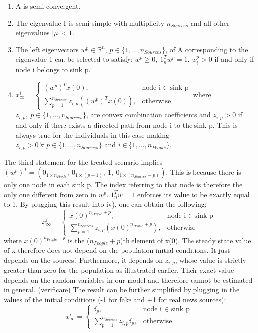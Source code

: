 \begin{enumerate}
	\item
	A is semi-convergent.
	\item
	The eigenvalue 1 is semi-simple with multiplicity $n_{Sources}$ and all other eigenvalues $|\mu|<1$.
	\item
	The left eigenvectors $w^p \in \mathbb{R}^n$, $p\in \{1,...,n_{Sources}\}$, of A corresponding to the eigenvalue 1 can be selected to satisfy: $w^p\geq0,\ 1_n^Tw^p=1$, $w^p_i>0$ if and only if node i belongs to sink p.
	\item
	$
	x_{\infty}^i = 
	\begin{cases}
	(w^p)^Tx(0),& \text{node i $\in$ sink p}\\
	\sum_{p=1}^{n_{Sources}} z_{i,p}((w^p)^Tx(0)), & \text{otherwise}
	\end{cases}
	$
	where $z_{i,p},\ p\in\{1,...,n_{Sources}\}$, are convex combination coefficients and $z_{i,p} > 0$ if and only if there exists a directed path from node i to the sink p. This is always true for the individuals in this case making $z_{i,p} > 0\ \forall\ p \in \{1,...,n_{Sources}\}$ and $i \in \{1,...,n_{People}\}$.
\end{enumerate}
The third statement for the treated scenario implies $(w^p)^T = (0_{1 \times n_{People}},\ 0_{1 \times (p-1)},\ 1,\ 0_{1 \times (n_{Sources}-p)})$. This is because there is only one node in each sink p. The index referring to that node is therefore the only one different from zero in $w^p$. $1_n^Tw=1$ enforces its value to be exactly equal to 1. By plugging this result into iv), one can obtain the following:
$$
x_{\infty}^i = 
\begin{cases}
	x(0)^{n_{People}+p},& \text{node i $\in$ sink p}\\
	\sum_{p=1}^{n_{Sources}} z_{i,p}(x(0)^{n_{People}+p}), & \text{otherwise}
\end{cases}
$$
where $x(0)^{n_{People}+p}$ is the ($n_{People}+p$)th element of x(0). The steady state value of x therefore does not depend on the population initial conditions. It just depends on the sources'. Furthermore, it depends on $z_{i,p}$, whose value is strictly greater than zero for the population as  illustrated earlier. Their exact value depends on the random variables in our model and therefore cannot be estimated in general. (verificare) \newline
The result can be further simplified by plugging in the values of the initial conditions (-1 for fake and +1 for real news sources):
$$
x_{\infty}^i = 
\begin{cases}
\delta_p,& \text{node i $\in$ sink p}\\
\sum_{p=1}^{n_{Sources}} z_{i,p}\delta_p, & \text{otherwise}
\end{cases}
$$
